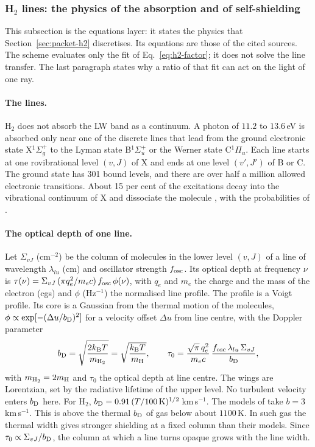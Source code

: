 \subsubsection{\texorpdfstring{H$_2$}{H2} lines: the physics of the absorption and of self-shielding}
\label{sec:packet-h2-physics}

This subsection is the equations layer: it states the physics that
Section~\ref{sec:packet-h2} discretises. Its equations are those of the cited
sources. The scheme evaluates only the fit of Eq.~\eqref{eq:h2-factor}; it does
not solve the line transfer. The last paragraph states why a ratio of that fit
can act on the light of one ray.

\paragraph{The lines.} H$_2$ does not absorb the LW band as a continuum. A
photon of $11.2$ to $13.6$\,eV is absorbed only near one of the discrete lines
that lead from the ground electronic state X$^1\Sigma_g^+$ to the Lyman state
B$^1\Sigma_u^+$ or the Werner state C$^1\Pi_u$. Each line starts at one
rovibrational level $(v,J)$ of X and ends at one level $(v',J')$ of B or C. The
ground state has 301 bound levels, and there are over half a million allowed
electronic transitions. About 15 per cent of the excitations decay into the
vibrational continuum of X and dissociate the molecule
\citep{WolcottGreenHaiman2019}, with the probabilities of \citet{Abgrall2000}.

\paragraph{The optical depth of one line.} Let $\Sigma_{vJ}$ (cm$^{-2}$) be the
column of molecules in the lower level $(v,J)$ of a line of wavelength
$\lambda_{lu}$ (cm) and oscillator strength $f_{\rm osc}$. Its optical depth at
frequency $\nu$ is
$\tau(\nu)=\Sigma_{vJ}\,(\pi q_e^2/m_ec)\,f_{\rm osc}\,\phi(\nu)$, with $q_e$
and $m_e$ the charge and the mass of the electron (cgs) and $\phi$ (Hz$^{-1}$)
the normalised line profile. The profile is a Voigt profile. Its core is a
Gaussian from the thermal motion of the molecules, $\phi\propto
\exp[-(\Delta u/b_{\rm D})^2]$ for a velocity offset $\Delta u$ from line
centre, with the Doppler parameter
\begin{equation}
  b_{\rm D}=\sqrt{\frac{2k_{\rm B}T}{m_{{\rm H}_2}}}=\sqrt{\frac{k_{\rm B}T}{m_{\rm H}}},
  \qquad
  \tau_0=\frac{\sqrt\pi\,q_e^2}{m_ec}\,\frac{f_{\rm osc}\,\lambda_{lu}\,\Sigma_{vJ}}{b_{\rm D}},
  \label{eq:h2-tau0}
\end{equation}
with $m_{{\rm H}_2}=2m_{\rm H}$ and $\tau_0$ the optical depth at line centre.
The wings are Lorentzian, set by the radiative lifetime of the upper level.
No turbulent velocity enters $b_{\rm D}$ here. For H$_2$,
$b_{\rm D}=0.91\,(T/100\,{\rm K})^{1/2}$\,km\,s$^{-1}$.
The models of \citet{DraineBertoldi1996} take $b=3$\,km\,s$^{-1}$. This is
above the thermal $b_{\rm D}$ of gas below about $1100$\,K. In such gas the
thermal width gives stronger shielding at a fixed column than their models.
Since $\tau_0\propto\Sigma_{vJ}/b_{\rm D}$,
the column at which a line turns opaque grows with the line width.

